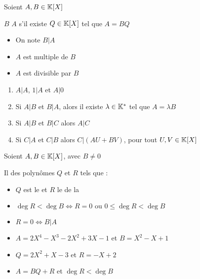 \begin{frame}
Soient $A,B \in\mathbb{K}[X]$
\begin{mydefinition}
$B$  $A$ s'il existe  $Q\in\mathbb{K}[X]$ tel que $A=BQ$
\end{mydefinition}

\pause

\begin{itemize}
  \item On note $B|A$
  \item $A$ est multiple de $B$
  \item $A$ est divisible par $B$
\end{itemize}

\pause

\begin{proposition}
\begin{enumerate}[<+->]
  \item $A|A$, $1|A$ et $A|0$
  \item Si $A|B$ et $B|A$, alors il existe $\lambda \in\mathbb{K}^*$ tel que $A=\lambda B$
  \item Si $A|B$ et $B|C$ alors $A|C$
  \item Si $C|A$ et $C|B$ alors  $C|(AU+BV)$, pour tout $U,V \in\mathbb{K}[X]$
\end{enumerate}  
\end{proposition}
\end{frame}


\begin{frame}
\begin{theoreme}
Soient $A,B \in\mathbb{K}[X]$, avec $B \neq 0$

Il  des polynômes $Q$ et $R$  tels que :
\end{theoreme}

\pause
\bigskip

\begin{itemize}[<+->]
  \item $Q$ est le  et $R$ le  de la 
  \item $\deg R < \deg B \iff R=0 \text{ ou } 0 \le \deg R < \deg B$
  \item $R=0 \iff  B|A$
\end{itemize}

\end{frame}

\begin{frame}
\begin{exemple}
\begin{itemize}
  \item $A=2X^4-X^3-2X^2+3X-1$ \quad et \quad  $B=X^2-X+1$
\pause  
  \item $Q= 2X^2+X-3$ \quad et \quad $R=-X+2$
\pause  
  \item $A=BQ+R$ et $\deg R < \deg B$
\end{itemize}
\pause  
{}

\end{exemple}
\end{frame}


